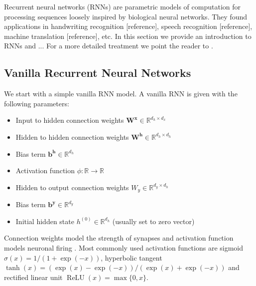 \documentclass[titlepage]{report}
\DeclareMathOperator{\relu}{ReLU}
\begin{document}
Recurrent neural networks (RNNs) \cite{rumelhart1985learning} are parametric models of computation for processing sequences loosely inspired by biological neural networks. They found applications in handwriting recognition [reference], speech recognition [reference], machine translation [reference], etc. In this section we provide an introduction to RNNs and ... For a more detailed treatment we point the reader to \cite{graves2012supervised}.

\subsection{Vanilla Recurrent Neural Networks}

We start with a simple vanilla RNN model. A vanilla RNN is given with the following parameters:

\begin{itemize}[itemsep = -2pt]
\item Input to hidden connection weights $\mathbf{W}^{\mathbf{x}} \in \mathbb{R}^{d_h \times d_x}$
\item Hidden to hidden connection weights $\mathbf{W}^{\mathbf{h}} \in \mathbb{R}^{d_h \times d_h}$
\item Bias term $\mathbf{b}^{\mathbf{h}} \in \mathbb{R}^{d_h}$
\item Activation function $\phi: \mathbb{R} \to \mathbb{R}$
\item Hidden to output connection weights $W_y \in \mathbb{R}^{d_y \times d_h}$
\item Bias term $\mathbf{b}^{\mathbf{y}} \in \mathbb{R}^{d_y}$
\item Initial hidden state $h^{(0)} \in \mathbb{R}^{d_h}$ (usually set to zero vector)
\end{itemize}

\noindent
Connection weights model the strength of synapses and activation function models neuronal firing \cite{llinas2008neuron}. Most commonly used activation functions are sigmoid $\sigma(x) = 1 / (1 + \exp(-x))$, hyperbolic tangent $\tanh(x) = (\exp(x) - \exp(-x)) / (\exp(x) + \exp(-x))$ and rectified linear unit $\relu(x) = \max \{ 0, x \}$.

\end{document}
